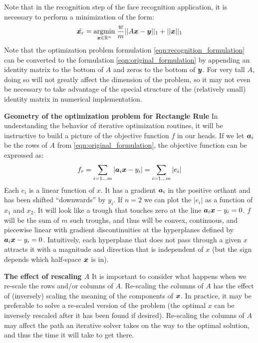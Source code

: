 %
Note that in the recognition step of the face recognition application, it is necessary to 
perform a minimization of the form:
%
\begin{equation}
\label{eqn:recognition_formulation}
\tilde{{\boldsymbol{x}}_r} = {\hbox{$\underset{{\boldsymbol{x}}\in \mathbb R^n}{\mbox{argmin}}\;$}} \frac{w}{m} || A {\boldsymbol{x}} - {\boldsymbol{y}} ||_1 + ||{\boldsymbol{x}}||_1
\end{equation}
%
Note that the optimization problem formulation \ref{eqn:recognition_formulation} can
be converted to the formulation \ref{eqn:original_formulation} by appending an identity
matrix to the bottom of $A$ and zeros to the bottom of ${\boldsymbol{y}}$.  For very tall $A$,
doing so will not greatly affect the dimension of the problem, so it may not even
be necessary to take advantage of the special structure of the 
(relatively small) identity matrix in numerical implementation.

{\bf Geometry of the optimization problem for Rectangle Rule}  
%
In understanding
the behavior of iterative optimization routines, it will be instructive to
build a picture of the objective function $f$ in our heads.  
If we let $\boldsymbol{a}_i$
be the rows of $A$ from \ref{eqn:original_formulation}, the objective function
can be expressed as:
\begin{equation}
f_r = \sum_{i=1\ldots m}| \boldsymbol{a}_i {\boldsymbol{x}} - y_i | = \sum_{i=1\ldots m} |e_i|
\end{equation}
Each $e_i$ is a linear function of $x$. It has a gradient $\boldsymbol{a}_i$ in the
positive orthant and has been shifted ``downwards'' by $y_i$.  If $n=2$ we can
plot the $|e_i|$ as a function of $x_1$ and $x_2$.  It will look like a trough
that touches zero at the line $\boldsymbol{a}_i {\boldsymbol{x}} - y_i=0$.  $f$ will be the sum of $m$
such troughs, and thus will be convex, continuous, and piecewise linear with
gradient discontinuities at the hyperplanes defined by $\boldsymbol{a}_i {\boldsymbol{x}} - y_i=0$.
Intuitively, each hyperplane that does not pass through a given $x$ attracts it
with a magnitude and direction that is independent of $x$ (but the sign depends
which half-space ${\boldsymbol{x}}$ is in).

{\bf The effect of rescaling $A$} It is important to consider what happens when
we re-scale the rows and/or columns of $A$.  Re-scaling the columns of $A$ has the effect of (inversely)
scaling the meaning of the components of ${\boldsymbol{x}}$.  In practice, it may be
preferable to solve a re-scaled version of the problem (the optimal $x$ can be
inversely rescaled after it has been found if desired).  Re-scaling the columns
of $A$ may affect the path an iterative solver takes on the way to the optimal
solution, and thus the time it will take to get there.  

